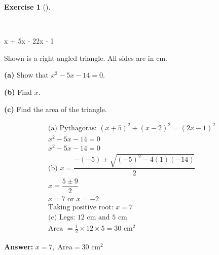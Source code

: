 \documentclass[
  letterpaper,
  DIV=11,
  numbers=noendperiod]{scrreprt}
\theoremstyle{definition}
\newtheorem{exercise}{Exercise}[chapter]
\theoremstyle{remark}
\begin{document}
\begin{exercise}[]\protect\hypertarget{exr-u6-29-2}{}\label{exr-u6-29-2}

~

x + 5x - 22x - 1

Shown is a right-angled triangle. All sides are in cm.

\textbf{(a)} Show that \(x^2 - 5x - 14 = 0\).

\textbf{(b)} Find \(x\).

\textbf{(c)} Find the area of the triangle.

\begin{tcolorbox}[enhanced jigsaw, opacitybacktitle=0.6, coltitle=black, arc=.35mm, colframe=quarto-callout-tip-color-frame, colback=white, bottomrule=.15mm, left=2mm, colbacktitle=quarto-callout-tip-color!10!white, titlerule=0mm, opacityback=0, title=\textcolor{quarto-callout-tip-color}{\faLightbulb}\hspace{0.5em}{🔍 View Solution}, leftrule=.75mm, breakable, rightrule=.15mm, bottomtitle=1mm, toptitle=1mm, toprule=.15mm]

\begin{align*}
\text{(a) Pythagoras: } (x + 5)^2 + (x - 2)^2 = (2x - 1)^2 \\ x^2 -5x -14 = 0 \\ x^2 - 5x - 14 = 0 \\ \text{(b) } x = \dfrac{-(-5) \pm \sqrt{(-5)^2 - 4(1)(-14)}}{2} \\ x = \dfrac{5 \pm 9}{2} \\ x = 7 \text{ or } x = -2 \\ \text{Taking positive root: } x = 7 \\ \text{(c) Legs: } 12 \text{ cm and } 5 \text{ cm} \\ \text{Area } = \tfrac{1}{2} \times 12 \times 5 = 30 \text{ cm}^2
\end{align*}

\textbf{Answer:} \(x = 7,\; \text{Area} = 30 \text{ cm}^2\)

\end{tcolorbox}

\end{exercise}
\end{document}
